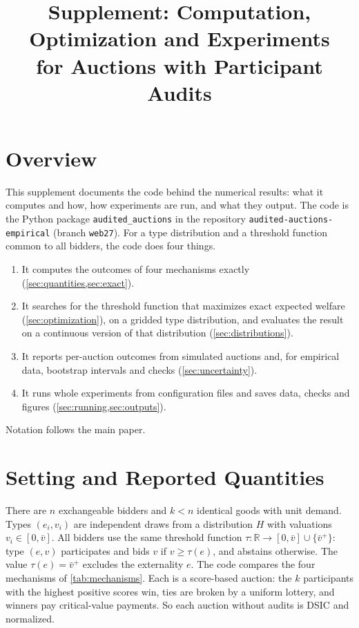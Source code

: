 \documentclass[11pt]{article}
\title{Supplement: Computation, Optimization and Experiments\\for Auctions with Participant Audits}
\author{}
\date{}
\newcommand{\vplus}{\bar v^{+}}
\newcommand{\code}[1]{\texttt{#1}}
\begin{document}
\maketitle

\section{Overview}\label{sec:overview}

This supplement documents the code behind the numerical results: what it computes and how, how experiments are run, and what they output. The code is the Python package \code{audited\_auctions} in the repository \code{audited-auctions-empirical} (branch \code{web27}). For a type distribution and a threshold function common to all bidders, the code does four things.
\begin{enumerate}
    \item It computes the outcomes of four mechanisms exactly (\cref{sec:quantities,sec:exact}).
    \item It searches for the threshold function that maximizes exact expected welfare (\cref{sec:optimization}), on a gridded type distribution, and evaluates the result on a continuous version of that distribution (\cref{sec:distributions}).
    \item It reports per-auction outcomes from simulated auctions and, for empirical data, bootstrap intervals and checks (\cref{sec:uncertainty}).
    \item It runs whole experiments from configuration files and saves data, checks and figures (\cref{sec:running,sec:outputs}).
\end{enumerate}
Notation follows the main paper.

\section{Setting and Reported Quantities}\label{sec:quantities}

There are $n$ exchangeable bidders and $k<n$ identical goods with unit demand. Types $(e_i,v_i)$ are independent draws from a distribution $H$ with valuations $v_i\in[0,\bar v]$. All bidders use the same threshold function $\tau:\mathbb{R}\to[0,\bar v]\cup\{\vplus\}$: type $(e,v)$ participates and bids $v$ if $v\geq\tau(e)$, and abstains otherwise. The value $\tau(e)=\vplus$ excludes the externality $e$. The code compares the four mechanisms of \cref{tab:mechanisms}. Each is a score-based auction: the $k$ participants with the highest positive scores win, ties are broken by a uniform lottery, and winners pay critical-value payments. So each auction without audits is DSIC and normalized.
\end{document}
